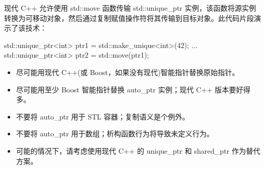 现代 C++ 允许使用 std::move 函数传输 std::unique\_ptr 实例，该函数将源实例转换为可移动对象，然后通过复制赋值操作符将其传输到目标对象。此代码片段演示了该技术：

\begin{cpp}
std::unique_ptr<int> ptr1 = std::make_unique<int>(42);
...
std::unique_ptr<int> ptr2 = std::move(ptr1);
\end{cpp}


\begin{itemize}
\item
尽可能用现代 C++(或 Boost，如果没有现代)智能指针替换原始指针。

\item
尽可能用至少 Boost 智能指针替换 auto\_ptr 实例；现代 C++ 版本要好得多。

\item
不要将 auto\_ptr 用于 STL 容器；复制语义是个例外。

\item
不要将 auto\_ptr 用于数组；析构函数行为将导致未定义行为。

\item
可能的情况下，请考虑使用现代 C++ 的 unique\_ptr 和 shared\_ptr 作为替代方案。
\end{itemize}






















